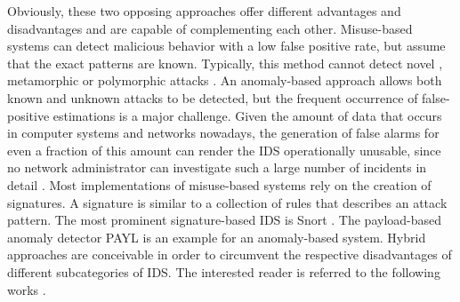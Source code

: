 Obviously, these two opposing approaches offer different advantages and disadvantages and are capable of complementing each other. Misuse-based systems can detect malicious behavior with a low false positive rate, but assume that the exact patterns  are known. Typically, this method cannot detect novel \cite[403]{whitman_principles_2018}, metamorphic or polymorphic attacks \cite[236]{szor2005art}. An anomaly-based approach allows both known and unknown attacks to be detected, but the frequent occurrence of false-positive estimations is a major challenge. Given the amount of data that occurs in computer systems and networks nowadays, the generation of false alarms for even a fraction of this amount can render the IDS operationally unusable, since no network administrator can investigate such a large number of incidents in detail \cite{axelsson2000base}. Most implementations of misuse-based systems rely on the creation of signatures. A signature is similar to a collection of rules that describes an attack pattern. The most prominent signature-based IDS is Snort \cite{roesch1999snort}. The payload-based anomaly detector PAYL \cite{wang2004anomalous} is an example for an anomaly-based system. Hybrid approaches are conceivable in order to circumvent the respective disadvantages of different subcategories of IDS. The interested reader is referred to the following works \cite{DEPREN2005713} \cite{zhang2006hybrid} \cite{beer_hybrid2021}.